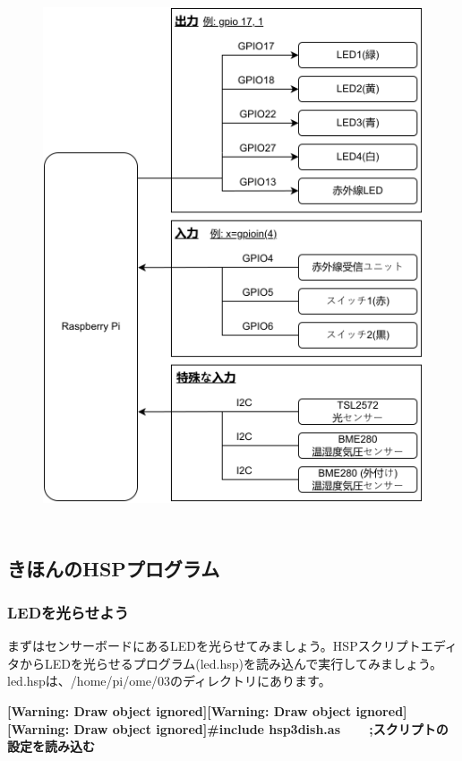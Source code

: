 \documentclass[a4paper,dvipdfmx]{jarticle}
\begin{document}
\begin{figure}
\centering
\includegraphics[width=14.982cm,height=15.942cm]{text03-img/text03-img031.png}
\end{figure}

\bigskip

\clearpage\subsection{きほんのHSPプログラム}
\subsubsection{LEDを光らせよう}
まずはセンサーボードにあるLEDを光らせてみましょう。HSPスクリプトエディタからLEDを光らせるプログラム(led.hsp)を読み込んで実行してみましょう。led.hspは、/home/pi/ome/03のディレクトリにあります。

{\ttfamily\bfseries
[Warning: Draw object ignored][Warning: Draw object ignored][Warning: Draw object ignored]\#include
{\textquotedbl}hsp3dish.as{\textquotedbl}\ \ \ \ \textcolor[rgb]{0.0,0.0,0.8}{;スクリプトの設定を読み込む}}
\end{document}
